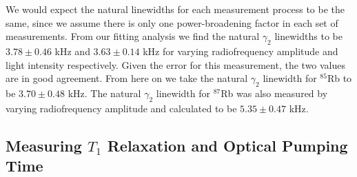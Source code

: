 We would expect the natural linewidths for each measurement process to be the same, since we assume there is only one power-broadening factor in each set of measurements. From our fitting analysis we find the natural $\gamma_2$ linewidths to be $3.78 \pm 0.46$ kHz and $3.63 \pm 0.14$ kHz for varying radiofrequency amplitude and light intensity respectively.  Given the error for this measurement, the two values are in good agreement. From here on we take the natural $\gamma_2$ linewidth for $^{85}$Rb to be $3.70 \pm 0.48$ kHz. The natural  $\gamma_2$ linewidth for $^{87}$Rb was also measured by varying radiofrequency amplitude and calculated to be $5.35 \pm 0.47$ kHz.

\subsection{Measuring $T_1$ Relaxation and Optical Pumping Time}\label{MeasuringT1RelaxationandOpticalPumpingTime}

